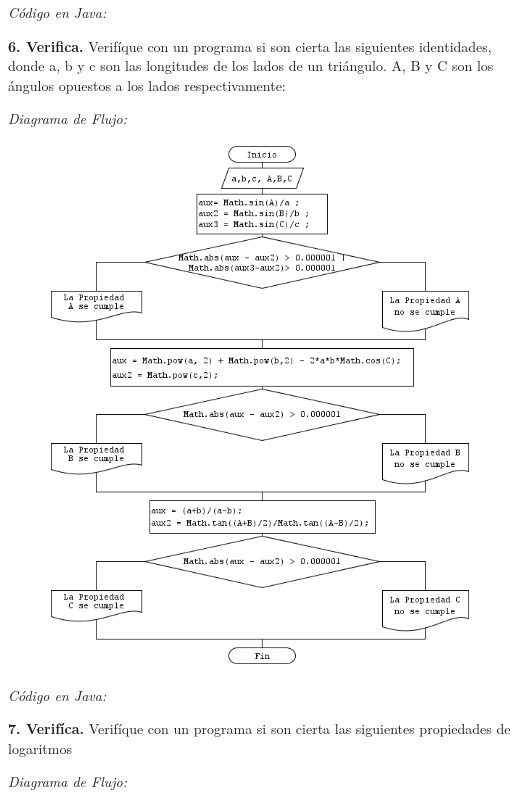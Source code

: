 \documentclass[12pt]{article}
\begin{document}
\textit{Código en Java:}

\newpage


\textbf{6. Verifica.} Verifíque con un programa si son cierta las siguientes identidades, donde a, b y
c son las longitudes de los lados de un triángulo. A, B y C son los ángulos opuestos a los
lados respectivamente:

\textit{Diagrama de Flujo:  }
\begin{figure}[h!]
\centering
	\includegraphics[scale=0.80]{dicor/Verifica.png}    
\end{figure}

\textit{Código en Java:}

\newpage

\textbf{7. Verifíca.} Verifíque con un programa si son cierta las siguientes propiedades de logaritmos

\textit{Diagrama de Flujo:  }
\begin{figure}[h!]
\centering
\end{figure}
\end{document}
